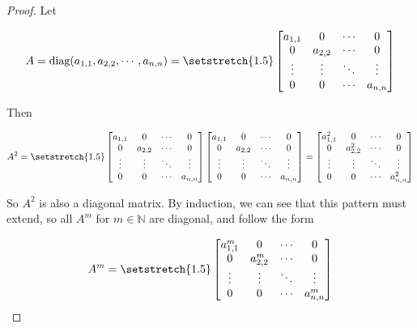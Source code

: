 \begin{proof}
Let

\begin{equation*}
	A = \text{diag}(a_{1,1}, a_{2,2}, \cdots, a_{n,n}) = {\setstretch{1.5}\begin{bmatrix}
a_{1, 1} & 0 & \cdots & 0\\
0 & a_{2, 2} & \cdots & 0\\
\vdots & \vdots & \ddots & \vdots\\
0 & 0 & \cdots & a_{n,n}
\end{bmatrix}}
\end{equation*}

\noindent Then

\begin{equation}
	A^{2} = {\setstretch{1.5}\begin{bmatrix}
a_{1, 1} & 0 & \cdots & 0\\
0 & a_{2, 2} & \cdots & 0\\
\vdots & \vdots & \ddots & \vdots\\
0 & 0 & \cdots & a_{n,n}
\end{bmatrix}\begin{bmatrix}
a_{1, 1} & 0 & \cdots & 0\\
0 & a_{2, 2} & \cdots & 0\\
\vdots & \vdots & \ddots & \vdots\\
0 & 0 & \cdots & a_{n,n}
\end{bmatrix} = \begin{bmatrix}
a_{1, 1}^{2} & 0 & \cdots & 0\\
0 & a_{2, 2}^{2} & \cdots & 0\\
\vdots & \vdots & \ddots & \vdots\\
0 & 0 & \cdots & a_{n,n}^{2}
\end{bmatrix}}
\end{equation}

So \(A^{2}\) is also a diagonal matrix. By induction, we can see that this pattern must extend, so all \(A^{m}\) for \(m \in \mathbb{N}\) are diagonal, and follow the form

\begin{equation}
	A^{m} = {\setstretch{1.5}\begin{bmatrix}
a_{1, 1}^{m} & 0 & \cdots & 0\\
0 & a_{2, 2}^{m} & \cdots & 0\\
\vdots & \vdots & \ddots & \vdots\\
0 & 0 & \cdots & a_{n,n}^{m}
\end{bmatrix}}
\end{equation}

\end{proof}

